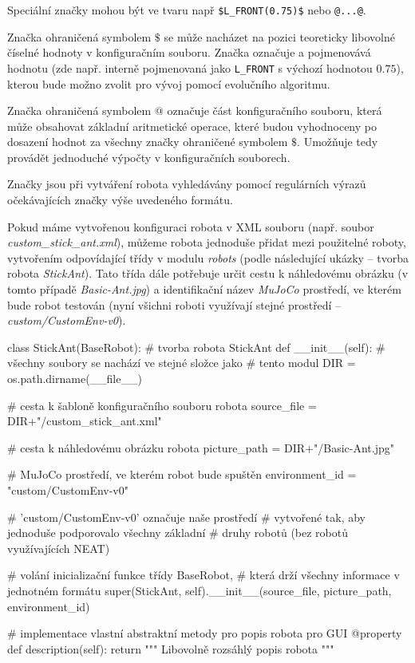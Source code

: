 Speciální značky mohou být ve tvaru např \texttt{\$L\_FRONT(0.75)\$} nebo
\texttt{@...@}. 

Značka ohraničená symbolem $\$$ se může nacházet na pozici teoreticky libovolné
číselné hodnoty v konfiguračním souboru. Značka označuje a pojmenovává hodnotu
(zde např. interně pojmenovaná jako \texttt{L\_FRONT} s výchozí hodnotou
$0.75$), kterou bude možno zvolit pro vývoj pomocí evolučního algoritmu. 

Značka ohraničená symbolem $@$ označuje část konfiguračního souboru, která může
obsahovat základní aritmetické operace, které budou vyhodnoceny po dosazení
hodnot za všechny značky ohraničené symbolem $\$$. Umožňuje tedy provádět
jednoduché výpočty v konfiguračních souborech.

Značky jsou při vytváření robota vyhledávány pomocí regulárních výrazů
očekávajících značky výše uvedeného formátu.

Pokud máme vytvořenou konfiguraci robota v XML souboru (např. soubor
\emph{custom\_stick\_ant.xml}), můžeme robota jednoduše přidat mezi použitelné
roboty, vytvořením odpovídající třídy v modulu \emph{robots} (podle následující
ukázky -- tvorba robota \emph{StickAnt}). Tato třída dále potřebuje určit cestu
k náhledovému obrázku (v tomto případě \emph{Basic-Ant.jpg}) a identifikační
název \emph{MuJoCo} prostředí, ve kterém bude robot testován (nyní všichni
roboti využívají stejné prostředí -- \emph{custom/CustomEnv-v0}).

\begin{code}
class StickAnt(BaseRobot): # tvorba robota StickAnt
    def __init__(self):
        # všechny soubory se nachází ve stejné složce jako 
        # tento modul
        DIR = os.path.dirname(__file__)

        # cesta k šabloně konfiguračního souboru robota
        source_file = DIR+"/custom_stick_ant.xml"

        # cesta k náhledovému obrázku robota
        picture_path = DIR+"/Basic-Ant.jpg"


        # MuJoCo prostředí, ve kterém robot bude spuštěn
        environment_id = "custom/CustomEnv-v0"

        # 'custom/CustomEnv-v0' označuje naše prostředí 
        # vytvořené tak, aby jednoduše podporovalo všechny základní 
        # druhy robotů (bez robotů využívajících NEAT)

        # volání inicializační funkce třídy BaseRobot,
        # která drží všechny informace v jednotném formátu
        super(StickAnt, self).__init__(source_file, 
                                       picture_path, 
                                       environment_id)

    # implementace vlastní abstraktní metody pro popis robota pro GUI
    @property
    def description(self):
        return """ Libovolně rozsáhlý popis robota """
\end{code}

